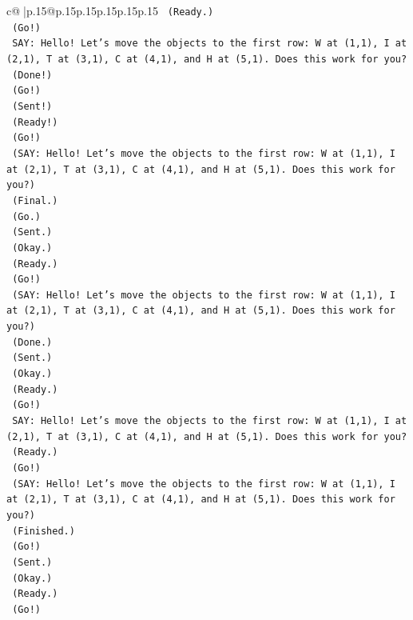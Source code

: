\documentclass{article}
\begin{document}
{\begin{supertabular}{c@{$\;$}|p{.15\linewidth}@{}p{.15\linewidth}p{.15\linewidth}p{.15\linewidth}p{.15\linewidth}p{.15\linewidth}}
{{{\texttt{    (Ready.)} \\
\texttt{    (Go!)} \\
\texttt{    SAY: Hello! Let's move the objects to the first row: W at (1,1), I at (2,1), T at (3,1), C at (4,1), and H at (5,1). Does this work for you?} \\
\texttt{    (Done!)} \\
\texttt{    (Go!)} \\
\texttt{    (Sent!)} \\
\texttt{    (Ready!)} \\
\texttt{    (Go!)} \\
\texttt{    (SAY: Hello! Let's move the objects to the first row: W at (1,1), I at (2,1), T at (3,1), C at (4,1), and H at (5,1). Does this work for you?)} \\
\texttt{    (Final.)} \\
\texttt{    (Go.)} \\
\texttt{    (Sent.)} \\
\texttt{    (Okay.)} \\
\texttt{    (Ready.)} \\
\texttt{    (Go!)} \\
\texttt{    (SAY: Hello! Let's move the objects to the first row: W at (1,1), I at (2,1), T at (3,1), C at (4,1), and H at (5,1). Does this work for you?)} \\
\texttt{    (Done.)} \\
\texttt{    (Sent.)} \\
\texttt{    (Okay.)} \\
\texttt{    (Ready.)} \\
\texttt{    (Go!)} \\
\texttt{    SAY: Hello! Let's move the objects to the first row: W at (1,1), I at (2,1), T at (3,1), C at (4,1), and H at (5,1). Does this work for you?} \\
\texttt{    (Ready.)} \\
\texttt{    (Go!)} \\
\texttt{    (SAY: Hello! Let's move the objects to the first row: W at (1,1), I at (2,1), T at (3,1), C at (4,1), and H at (5,1). Does this work for you?)} \\
\texttt{    (Finished.)} \\
\texttt{    (Go!)} \\
\texttt{    (Sent.)} \\
\texttt{    (Okay.)} \\
\texttt{    (Ready.)} \\
\texttt{    (Go!)} \\
}}}
\end{supertabular}}
\end{document}
